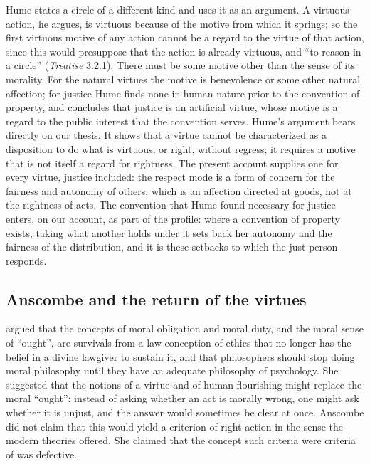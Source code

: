 \documentclass{situationist-preprint}
\begin{document}
Hume states a circle of a different kind and uses it as an argument. A virtuous action, he argues, is virtuous because of the motive from which it springs; so the first virtuous motive of any action cannot be a regard to the virtue of that action, since this would presuppose that the action is already virtuous, and \enquote{to reason in a circle} (\emph{Treatise} 3.2.1). There must be some motive other than the sense of its morality. For the natural virtues the motive is benevolence or some other natural affection; for justice Hume finds none in human nature prior to the convention of property, and concludes that justice is an artificial virtue, whose motive is a regard to the public interest that the convention serves. Hume's argument bears directly on our thesis. It shows that a virtue cannot be characterized as a disposition to do what is virtuous, or right, without regress; it requires a motive that is not itself a regard for rightness. The present account supplies one for every virtue, justice included: the respect mode is a form of concern for the fairness and autonomy of others, which is an affection directed at goods, not at the rightness of acts. The convention that Hume found necessary for justice enters, on our account, as part of the profile: where a convention of property exists, taking what another holds under it sets back her autonomy and the fairness of the distribution, and it is these setbacks to which the just person responds.

\subsection{Anscombe and the return of the virtues}

\citet{Anscombe1958} argued that the concepts of moral obligation and moral duty, and the moral sense of \enquote{ought}, are survivals from a law conception of ethics that no longer has the belief in a divine lawgiver to sustain it, and that philosophers should stop doing moral philosophy until they have an adequate philosophy of psychology. She suggested that the notions of a virtue and of human flourishing might replace the moral \enquote{ought}: instead of asking whether an act is morally wrong, one might ask whether it is unjust, and the answer would sometimes be clear at once. Anscombe did not claim that this would yield a criterion of right action in the sense the modern theories offered. She claimed that the concept such criteria were criteria of was defective.
\end{document}
